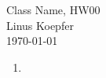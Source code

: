 \documentclass[12pt]{article}
\begin{document}
\begin{center}
{\large Class Name, HW00}\\
Linus Koepfer\\
\today
\end{center}

\begin{enumerate}
	\item
\end{enumerate}
\end{document}
